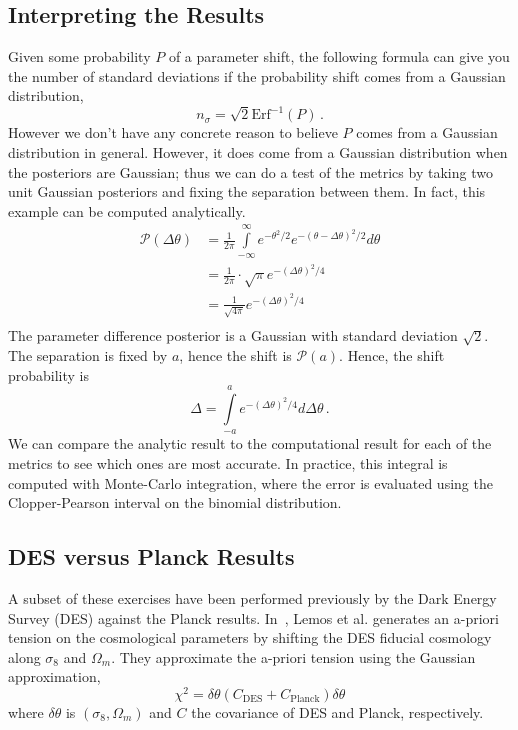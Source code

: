 \subsection{Interpreting the Results}
Given some probability $P$ of a parameter shift, the following formula can give you the number of standard deviations if the probability shift comes from a Gaussian distribution,
\begin{equation}
	n_\sigma = \sqrt{2} \text{Erf}^{-1}(P)\,.
\end{equation}
However we don't have any concrete reason to believe $P$ comes from a Gaussian distribution in general. However, it does come from a Gaussian distribution when the posteriors are Gaussian; thus we can do a test of the metrics by taking two unit Gaussian posteriors and fixing the separation between them. In fact, this example can be computed analytically.
\begin{equation}
    \begin{split}
	\mathcal{P}(\Delta \theta) &= \frac{1}{2\pi} \int\limits_{-\infty}^{\infty} e^{-\theta^2/2} e^{-{(\theta-\Delta\theta)}^2/2}  d\theta \\
				  			   &= \frac{1}{2\pi} \cdot \sqrt{\pi} e^{-{(\Delta\theta)}^2/4}\\
				   			   &= \frac{1}{\sqrt{4\pi}}e^{-{(\Delta\theta)}^2/4}\\
    \end{split}
\end{equation}
The parameter difference posterior is a Gaussian with standard deviation $\sqrt{2}$. The separation is fixed by $a$, hence the shift is $\mathcal{P}(a)$. Hence, the shift probability is
\begin{equation}
	\Delta = \int\limits_{-a}^{a} e^{-{(\Delta\theta)}^2/4} d\Delta\theta\,.
\end{equation}
We can compare the analytic result to the computational result for each of the metrics to see which ones are most accurate. In practice, this integral is computed with Monte-Carlo integration, where the error is evaluated using the Clopper-Pearson interval on the binomial distribution.
\subsection{DES versus Planck Results}
A subset of these exercises have been performed previously by the Dark Energy Survey (DES) against the Planck results. In~\cite{lemos_assessing_2021}, Lemos et al. generates an a-priori tension on the cosmological parameters by shifting the DES fiducial cosmology along $\sigma_8$ and $\Omega_m$. They approximate the a-priori tension using the Gaussian approximation,
\begin{equation}\label{eq:a-priori}
	\chi^2 = \delta\theta (C_\mathrm{DES}+C_\mathrm{Planck})\delta\theta
\end{equation}
where $\delta\theta$ is $(\sigma_8,\Omega_m)$ and $C$ the covariance of DES and Planck, respectively.

